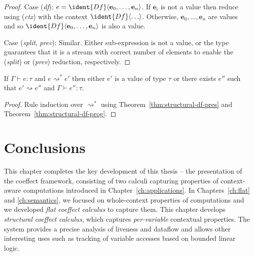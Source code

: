 \begin{proof}
\vspace{0.25em}\noindent\hangindent=0.6cm
Case (\emph{df}): $e = \ident{Df}\langle \textbf{e}_0, \ldots, \textbf{e}_n\rangle$. If $\textbf{e}_i$ is not a value
  then reduce using (\emph{ctx}) with the context $\ident{Df}\langle \ldots \rangle$.
  Otherwise, $\textbf{e}_0, \ldots, \textbf{e}_n$ are values and so $\ident{Df}\langle \textbf{e}_0, \ldots, \textbf{e}_n\rangle$
  is also a value.

\vspace{0.25em}\noindent\hangindent=0.6cm
Case (\emph{split}, \emph{prev}): Similar. Either sub-expression is not a value, or the type
  guarantees that it is a stream with correct number of elements to enable the (\emph{split})
  or (\emph{prev}) reduction, respectively.
\end{proof}

\begin{theorem}
  If $\Gamma \vdash e : \tau$ and $e \rightsquigarrow^{*} e'$ then either $e'$ is a value of type $\tau$ or
  there exists $e''$ such that $e' \rightsquigarrow e''$ and $\Gamma \vdash e'' : \tau$.
\end{theorem}
\begin{proof}
  Rule induction over $\rightsquigarrow^*$ using Theorem~\ref{thm:structural-df-pres} and Theorem~\ref{thm:structural-df-prog}.
\end{proof}


%
%


\section{Conclusions}

This chapter completes the key development of this thesis -- the presentation of the coeffect
framework, consisting of two calculi capturing properties of context-aware computations introduced
in Chapter~\ref{ch:applications}. In Chapters~\ref{ch:flat} and \ref{ch:semantics}, we focused on
whole-context properties of computations and we developed \emph{flat coeffect calculus} to capture them.
This chapter develops \emph{structural coeffect calculus}, which captures \emph{per-variable}
contextual properties. The system provides a precise analysis of liveness and dataflow and allows
other interesting uses such as tracking of variable accesses based on bounded linear logic.

